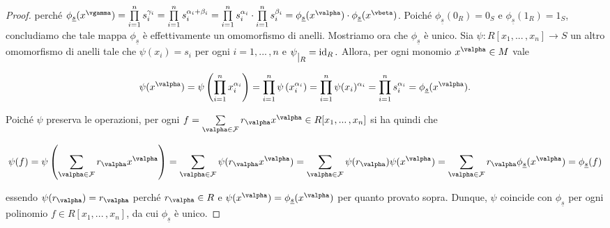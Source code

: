 \begin{proof}
  \noindent perché $\phi_{\underline{s}}(x^{\vgamma})=\prod\limits_{i=1}^n s_i^{\gamma_i}=\prod\limits_{i=1}^n s_i^{\alpha_i+\beta_i}=
  \prod\limits_{i=1}^n s_i^{\alpha_i}\cdot \prod\limits_{i=1}^n s_i^{\beta_i}=\phi_{\underline{s}}(x^{\valpha})\cdot \phi_{\underline{s}}(x^{\vbeta})$.
  Poiché $\phi_{\underline{s}}(0_R)=0_S$ e $ \phi_{\underline{s}}(1_R)=1_S$, concludiamo che tale mappa $\phi_{\underline{s}}$ 
  è effettivamente un omomorfismo di anelli.
  \vspace{2mm}
  \noindent Mostriamo ora che $\phi_{\underline{s}}$ è unico. 
  Sia $\psi\colon R[x_1,...\,,x_n]\to S$ un altro omomorfismo di anelli tale che $\psi(x_i)=s_i$ 
  per ogni $i=1,...\,,n$ e $\psi \raisebox{-.5em}{$\vert_{R}$}= \operatorname{id}_R.$ Allora, 
  per ogni monomio $x^{\valpha}\in M$ vale 
  
  $$\psi(x^{\valpha})=\psi\left(\prod\limits_{i=1}^n x_i^{\alpha_i}\right)=\prod\limits_{i=1}^n 
  \psi\left(x_i^{\alpha_i}\right)=\prod\limits_{i=1}^n \psi(x_i)^{\alpha_i}=\prod\limits_{i=1}^n s_i^{\alpha_i}=
  \phi_{\underline{s}}(x^{\valpha}).$$ 
  
  \noindent Poiché $\psi$ preserva le operazioni, per ogni $f=\sum\limits_{\valpha\in \mathcal{F}} r_{\valpha}x^{\valpha}\in R[x_1,...\,,x_n]$ 
  si ha quindi che 
  
  \[ \psi(f)=\psi\left(\sum\limits_{\valpha\in \mathcal{F}} r_{\valpha}x^{\valpha}\right)=\sum\limits_{\valpha\in \mathcal{F}} 
  \psi(r_{\valpha}x^{\valpha})=\sum\limits_{\valpha\in \mathcal{F}} \psi(r_{\valpha})\psi(x^{\valpha})=
  \sum\limits_{\valpha\in \mathcal{F}} r_{\valpha}\phi_{\underline{s}}(x^{\valpha})=\phi_{\underline{s}}(f)\] 
  
  \noindent essendo $\psi(r_{\valpha})=r_{\valpha}$ perché $r_{\valpha}\in R$ e $\psi(x^{\valpha})=\phi_{\underline{s}}(x^{\valpha})$ 
  per quanto provato sopra. Dunque, $\psi$ coincide con $\phi_{\underline{s}}$ per ogni polinomio $f\in R[x_1,...\,,x_n]$, 
  da cui $\phi_{\underline{s}}$ è unico.
\end{proof}

